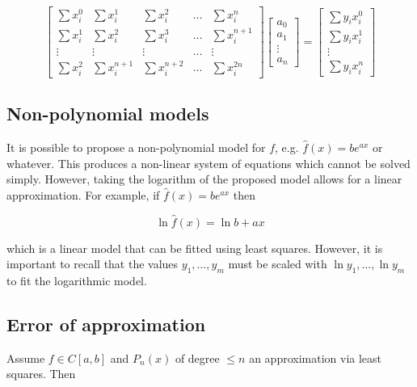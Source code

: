 \documentclass[12pt]{article}
\theoremstyle{definition}
\begin{document}
\begin{equation*}
    \begin{bmatrix} 
        \sum x_i^0 & \sum x_i^1 & \sum x_i^2  & \ldots & \sum x_i^n  \\ 
        \sum x_i^1 & \sum x_i^2 & \sum x_i^3 & \ldots & \sum x_i^{n+1} \\ 
        \vdots & \vdots & \vdots & \ldots & \vdots \\ 
        \sum x_i^2 & \sum x_i^{n+1} & \sum x_i^{n+2} & \ldots & \sum x_i^{2n}
    \end{bmatrix} \begin{bmatrix} 
            a_0 \\ a_1 \\ \vdots \\ a_n 
    \end{bmatrix} = \begin{bmatrix} 
            \sum y_ix_i^0 \\ 
            \sum y_ix_i^1 \\ 
            \vdots \\ 
            \sum y_i x_i^n
    \end{bmatrix} 
\end{equation*}

\subsection{Non-polynomial models}

It is possible to propose a non-polynomial model for $f$, e.g. $\hat{f}(x) = b
e^{ax}$ or whatever. This produces a non-linear system of equations which cannot
be solved simply. However, taking the logarithm of the proposed model allows for
a linear approximation. For example, if $\hat{f}(x) = be^{ax}$ then 

\begin{equation*}
    \ln \hat{f}(x) = \ln b + ax
\end{equation*}

which is a linear model that can be fitted using least squares. However, it is
important to recall that the values $y_1, \ldots, y_m$ must be scaled with $\ln
y_1, \ldots, \ln y_m$ to fit the logarithmic model.

\subsection{Error of approximation}

Assume $f \in C[a, b]$ and $P_n(x)$ of degree $\leq n$ an approximation via
least squares. Then 
\end{document}
